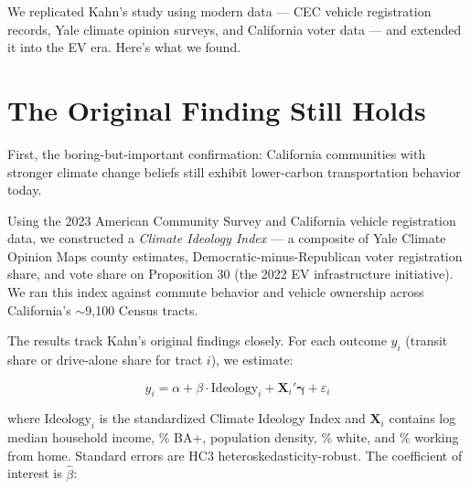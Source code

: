 \documentclass[12pt]{article}
\begin{document}
We replicated Kahn's study using modern data --- CEC vehicle registration records, Yale
climate opinion surveys, and California voter data --- and extended it into the EV era.
Here's what we found.

\section{The Original Finding Still Holds}

First, the boring-but-important confirmation: California communities with stronger climate
change beliefs still exhibit lower-carbon transportation behavior today.

Using the 2023 American Community Survey and California vehicle registration data, we
constructed a \textit{Climate Ideology Index} --- a composite of Yale Climate Opinion Maps county
estimates, Democratic-minus-Republican voter registration share, and vote share on
Proposition 30 (the 2022 EV infrastructure initiative). We ran this index against commute
behavior and vehicle ownership across California's $\sim$9,100 Census tracts.

The results track Kahn's original findings closely. For each outcome $y_i$ (transit share or
drive-alone share for tract $i$), we estimate:

\begin{equation}
  y_i = \alpha + \beta \cdot \text{Ideology}_i + \mathbf{X}_i'\boldsymbol{\gamma} + \varepsilon_i
  \label{eq:crosssection}
\end{equation}

where $\text{Ideology}_i$ is the standardized Climate Ideology Index and $\mathbf{X}_i$ contains
log median household income, \% BA+, population density, \% white, and \% working from home.
Standard errors are HC3 heteroskedasticity-robust. The coefficient of interest is $\hat{\beta}$:
\end{document}
